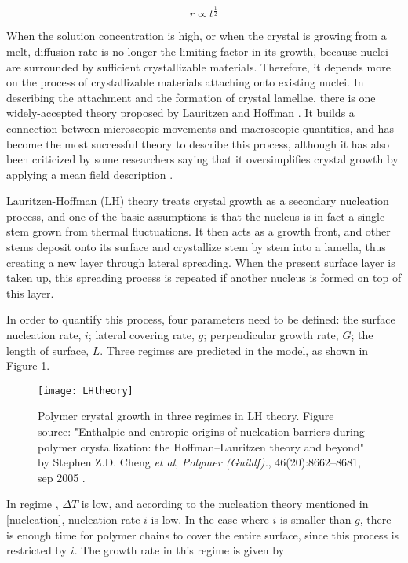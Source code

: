 \begin{equation}
\label{eqn_diffusion crystal radius}
r \propto t^{\frac{1}{2}}
\end{equation}

When the solution concentration is high, or when the crystal is growing from a melt, diffusion rate is no longer the limiting factor in its growth, because nuclei are surrounded by sufficient crystallizable materials. Therefore, it depends more on the process of crystallizable materials attaching onto existing nuclei. In describing the attachment and the formation of crystal lamellae, there is one widely-accepted theory proposed by Lauritzen and Hoffman \cite{Lauritzen,Hoffman,Lauritzen1973}. It builds a connection between microscopic movements and macroscopic quantities, and has become the most successful theory to describe this process, although it has also been criticized by some researchers saying that it oversimplifies crystal growth by applying a mean field description \cite{Zhang2016a}.

Lauritzen-Hoffman (LH) theory treats crystal growth as a secondary nucleation process, and one of the basic assumptions is that the nucleus is in fact a single stem grown from thermal fluctuations. It then acts as a growth front, and other stems deposit onto its surface and crystallize stem by stem into a lamella, thus creating a new layer through lateral spreading. When the present surface layer is taken up, this spreading process is repeated if another nucleus is formed on top of this layer.

In order to quantify this process, four parameters need to be defined: the surface nucleation rate, $i$; lateral covering rate, $g$; perpendicular growth rate, $G$; the length of surface, $L$. Three regimes are predicted in the model, as shown in Figure \ref{fig:LH theory}.

\begin{figure}[H]
\center
\texttt{[image: LHtheory]}
\caption[Polymer crystal growth in three regimes in LH theory.]{Polymer crystal growth in three regimes in LH theory. Figure source: "Enthalpic and entropic origins of nucleation barriers during polymer crystallization: the Hoffman–Lauritzen theory and beyond" by Stephen Z.D. Cheng \textit{et al}, \textit{Polymer (Guildf).}, 46(20):8662–8681, sep 2005  \cite{Cheng2005}.}
\label{fig:LH theory}
\end{figure}

In regime , $\Delta T$ is low, and according to the nucleation theory \cite{Turnbull1949} mentioned in \ref{nucleation}, nucleation rate $i$ is low. In the case where $i$ is smaller than $g$, there is enough time for polymer chains to cover the entire surface, since this process is restricted by $i$. The growth rate in this regime is given by

